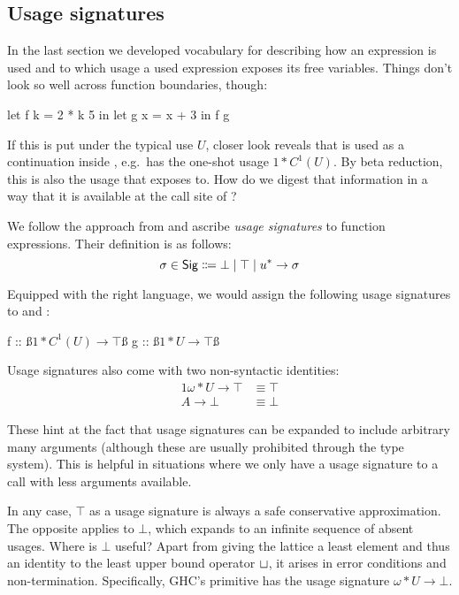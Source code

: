 \subsection{Usage signatures}

In the last section we developed vocabulary for describing how an expression is used and to which usage a used expression exposes its free variables. Things don't look so well across function boundaries, though:

\begin{haskellcode}
let f k = 2 * k 5
in let g x = x + 3 
   in f g
\end{haskellcode}

If this is put under the typical use $U$, closer look reveals that  is used as a continuation inside , e.g.\ has the one-shot usage $1*C^1(U)$.
By beta reduction, this is also the usage that  exposes  to.
How do we digest that information in a way that it is available at the call site of ?

We follow the approach from \textcite{card} and ascribe \emph{usage signatures} to function expressions. Their definition is as follows:
\[
\sigma \in \text{\textsf{Sig}} \Coloneqq \bot \mid \top \mid u^* \to \sigma
\]

Equipped with the right language, we would assign the following usage signatures to  and :

\begin{haskellcode}
f :: ß$1*C^1(U) \to \top$ß
g :: ß$1*U \to \top$ß
\end{haskellcode}

Usage signatures also come with two non-syntactic identities:
\begin{alignat*}{1}
  \omega*U \to \top &\equiv \top \\ 
  A \to \bot        &\equiv \bot
\end{alignat*}

These hint at the fact that usage signatures can be expanded to include arbitrary many arguments (although these are usually prohibited through the type system). 
This is helpful in situations where we only have a usage signature to a call with less arguments available. 

In any case, $\top$ as a usage signature is always a safe conservative approximation. 
The opposite applies to $\bot$, which expands to an infinite sequence of absent usages. 
Where is $\bot$ useful? 
Apart from giving the lattice a least element and thus an identity to the least upper bound operator $\sqcup$, it arises in error conditions and non-termination. 
Specifically, GHC's primitive  has the usage signature $\omega*U \to \bot$.

